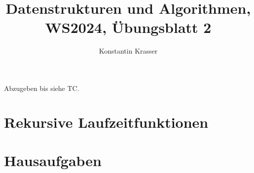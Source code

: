 \documentclass[11pt]{article}
\begin{document}
\author{Konstantin Krasser}
\title{Datenstrukturen und Algorithmen, WS2024, Übungsblatt 2}
\maketitle

\medskip

Abzugeben bis siehe TC.

\section*{Rekursive Laufzeitfunktionen}

\section*{Hausaufgaben}
\end{document}
